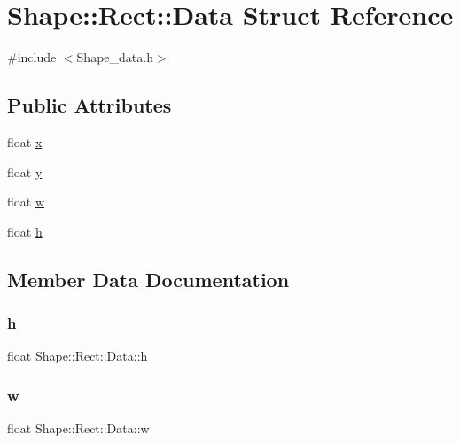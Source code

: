 \hypertarget{struct_shape_1_1_rect_1_1_data}{}\section{Shape\+:\+:Rect\+:\+:Data Struct Reference}
\label{struct_shape_1_1_rect_1_1_data}


{\ttfamily \#include $<$Shape\+\_\+data.\+h$>$}

\subsection*{Public Attributes}
\begin{DoxyCompactItemize}
\item 
float \mbox{\hyperlink{struct_shape_1_1_rect_1_1_data_a84ab13209189e585eba6aaa128aa9c04}{x}}
\item 
float \mbox{\hyperlink{struct_shape_1_1_rect_1_1_data_a5b9133d085626c33eb11f6da8b6bc24c}{y}}
\item 
float \mbox{\hyperlink{struct_shape_1_1_rect_1_1_data_a0b21d4e161c8ae58c528e15dadeac5f7}{w}}
\item 
float \mbox{\hyperlink{struct_shape_1_1_rect_1_1_data_aa5c45484422eaf533517307b774e05f4}{h}}
\end{DoxyCompactItemize}


\subsection{Member Data Documentation}
\mbox{\label{struct_shape_1_1_rect_1_1_data_aa5c45484422eaf533517307b774e05f4}} 
\subsubsection{\texorpdfstring{h}{h}}
{\footnotesize\ttfamily float Shape\+::\+Rect\+::\+Data\+::h}

\mbox{\label{struct_shape_1_1_rect_1_1_data_a0b21d4e161c8ae58c528e15dadeac5f7}} 
\subsubsection{\texorpdfstring{w}{w}}
{\footnotesize\ttfamily float Shape\+::\+Rect\+::\+Data\+::w}

